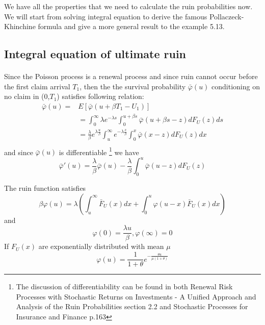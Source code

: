 \documentclass[project2.tex]{subfiles}
\begin{document}
We have all the properties that we need to calculate the ruin probabilities now. We will start from solving integral equation to derive the famous Pollaczeck-Khinchine formula and give a more general result to the example 5.13.
\subsection{Integral equation of ultimate ruin}
\paragraph{}
Since the Poisson process is a renewal process and since ruin cannot occur before the first claim arrival $T_1$, then the the survival probability $\bar{\varphi}(u)$ conditioning on no claim in (0,$T_1$) satisfies following relation:
\begin{align*}
\bar{\varphi}(u)=&E[\bar{\varphi}(u+\beta T_1-U_1)]\\
&=\int_0^{\infty}\lambda e^{-\lambda s}\int_0^{u+\beta s}\bar{\varphi}(u+\beta s-z)dF_U(z)ds\\
&=\frac{\lambda}{\beta}e^{\lambda\frac{u}{\beta}}\int_u^{\infty}e^{-\lambda \frac{x}{\beta}}\int_0^{x}\bar{\varphi}(x-z)dF_U(z)dx\\
\end{align*}
and since  $\bar{\varphi}(u)$ is differentiable  \footnote{The discussion of differentiability can be found in both Renewal Risk Processes with Stochastic Returns on Investments - A Unified
Approach and Analysis of the Ruin Probabilities section 2.2 and Stochastic Processes for Insurance and Finance p.163} we have
$$\bar{\varphi}'(u)=\frac{\lambda}{\beta}\bar{\varphi}(u)-\frac{\lambda}{\beta}\int^u_0\bar{\varphi}(u-z)dF_U(z)$$
\begin{theorem}
The ruin function satisfies 
$$\beta\varphi(u)=\lambda(\int_{u}^{\infty}\bar{F}_U(x)dx+\int_{0}^{u}\varphi(u-x)\bar{F}_U(x)dx)$$ and
$$\varphi(0)=\frac{\lambda u}{\beta},\varphi(\infty)=0$$
If $F_U(x)$ are exponentially distributed with mean $\mu$
$$\varphi(u)=\frac{1}{1+\theta}e^{-\frac{\theta u}{\mu(1+\theta)}}$$
\end{theorem}
\end{document}
